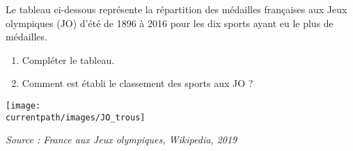 
\begin{exercice*}
   Le tableau ci-dessous représente la répartition des médailles françaises aux Jeux olympiques (JO) d'été de 1896 à 2016 pour les dix sports ayant eu le plus de médailles.
   \begin{enumerate}
      \item Compléter le tableau.
      \item Comment est établi le classement des sports aux JO ?
   \end{enumerate}   
   \begin{center}
      \texttt{[image: \\currentpath/images/JO\_trous]}

      \hfill {\footnotesize\it Source : France aux Jeux olympiques, Wikipedia, 2019}
   \end{center}
\end{exercice*}
